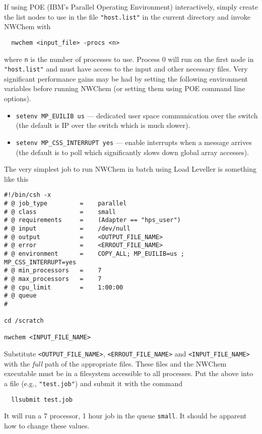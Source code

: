 If using POE (IBM's Parallel Operating Environment) interactively,
simply create the list nodes to use in the file \verb+"host.list"+ in
the current directory and invoke NWChem with
\begin{verbatim}
  nwchem <input_file> -procs <n>
\end{verbatim}
where \verb+n+ is the number of processes to use.  Process 0 will run
on the first node in \verb+"host.list"+ and must have access to the
input and other necessary files.  Very significant performance gains
may be had by setting the following environment variables before
running NWChem (or setting them using POE command line options).
\begin{itemize}
\item \verb+setenv MP_EUILIB us+ --- dedicated user space
  communication over the switch (the default is IP over the switch
  which is much slower).
\item \verb+setenv MP_CSS_INTERRUPT yes+ --- enable interrupts when a 
  message arrives (the default is to poll which significantly slows
  down global array accesses).
\end{itemize}

The very simplest job to run NWChem in batch using Load Leveller is
something like this
\begin{verbatim}
#!/bin/csh -x
# @ job_type         =    parallel
# @ class            =    small
# @ requirements     =    (Adapter == "hps_user")
# @ input            =    /dev/null
# @ output           =    <OUTPUT_FILE_NAME>
# @ error            =    <ERROUT_FILE_NAME>
# @ environment      =    COPY_ALL; MP_EUILIB=us ; MP_CSS_INTERRUPT=yes
# @ min_processors   =    7
# @ max_processors   =    7
# @ cpu_limit        =    1:00:00
# @ queue
#

cd /scratch

nwchem <INPUT_FILE_NAME>
\end{verbatim}

Substitute \verb+<OUTPUT_FILE_NAME>+, \verb+<ERROUT_FILE_NAME>+ and
\verb+<INPUT_FILE_NAME>+ with the {\em full} path of the appropriate
files.  These files and the NWChem executable must be in a filesystem
accessible to all processes.  Put the above into a file (e.g.,
\verb+"test.job"+) and submit it with the command
\begin{verbatim}
  llsubmit test.job
\end{verbatim}
It will run a 7 processor, 1 hour job in the queue \verb+small+.  It
should be apparent how to change these values.

